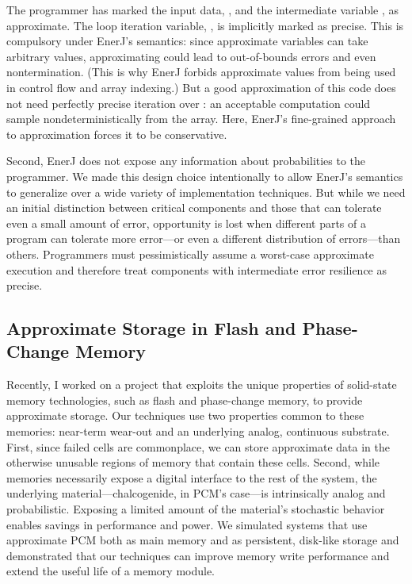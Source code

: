 The programmer has marked the input data, , and the intermediate
variable , as approximate.
The loop iteration variable, , is implicitly marked as precise. This
is compulsory under EnerJ's semantics: since approximate variables can take
arbitrary values, approximating  could lead to out-of-bounds errors
and even nontermination. (This is why EnerJ forbids approximate values from
being used in control flow and array indexing.) But a good approximation
of this code does not need perfectly precise iteration over : an
acceptable computation could sample nondeterministically from the array.
Here, EnerJ's fine-grained approach to approximation forces it to be
conservative.

Second, EnerJ does not expose any information about probabilities to the
programmer. We made this design choice intentionally to allow EnerJ's
semantics to generalize over a wide variety of implementation techniques. But
while we need an initial distinction between critical components and those
that can tolerate even a small amount of error, opportunity is lost when
different parts of a program can tolerate more error---or even a different
distribution of errors---than others. Programmers must pessimistically
assume a worst-case approximate execution and therefore treat components with
intermediate error resilience as precise.

\subsection{Approximate Storage in Flash and Phase-Change Memory}

Recently, I worked on a project that exploits the unique properties of
solid-state memory technologies, such as flash and phase-change memory,
to provide approximate storage. Our techniques use two properties common to these memories:
near-term wear-out and an underlying analog, continuous substrate. First, since
failed cells are commonplace, we can store approximate data in the otherwise
unusable regions of memory that contain these cells. Second, while memories
necessarily expose a digital interface to the rest of the system, the
underlying material---chalcogenide, in PCM's case---is intrinsically analog
and probabilistic. Exposing a limited amount of the material's stochastic
behavior enables savings in performance and power.
We simulated systems that use approximate PCM both as main memory and as
persistent, disk-like storage and demonstrated that our techniques can improve
memory write performance and extend the useful life of a memory module.

